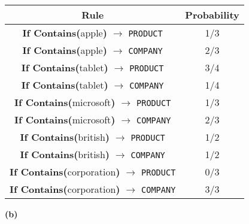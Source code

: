 \documentclass[11pt]{article}
\renewcommand\part[1]{\vspace{.10in}\textbf{(#1)}}
\begin{document}
 \begin{table}[H]
\centering
{\renewcommand{\arraystretch}{1.4}%
\begin{tabular}{| c | c |}
\hline
\textbf{Rule} & \textbf{Probability}\\
\hline
\textbf{If Contains(}apple\textbf{)} $\rightarrow$ {\tt PRODUCT} & 1/3\\ \hline
\textbf{If Contains(}apple\textbf{)} $\rightarrow$ {\tt COMPANY} & 2/3\\ \hline
\textbf{If Contains(}tablet\textbf{)} $\rightarrow$ {\tt PRODUCT} & 3/4\\ \hline
\textbf{If Contains(}tablet\textbf{)} $\rightarrow$ {\tt COMPANY} & 1/4\\ \hline
\textbf{If Contains(}microsoft\textbf{)} $\rightarrow$ {\tt PRODUCT} & 1/3\\ \hline
\textbf{If Contains(}microsoft\textbf{)} $\rightarrow$ {\tt COMPANY} & 2/3\\ \hline
\textbf{If Contains(}british\textbf{)} $\rightarrow$ {\tt PRODUCT} & 1/2\\ \hline
\textbf{If Contains(}british\textbf{)} $\rightarrow$ {\tt COMPANY} & 1/2\\ \hline
\textbf{If Contains(}corporation\textbf{)} $\rightarrow$ {\tt PRODUCT} & 0/3\\ \hline
\textbf{If Contains(}corporation\textbf{)} $\rightarrow$ {\tt COMPANY} & 3/3\\ \hline
\end{tabular}}
\end{table}

\part{b}
\end{document}
